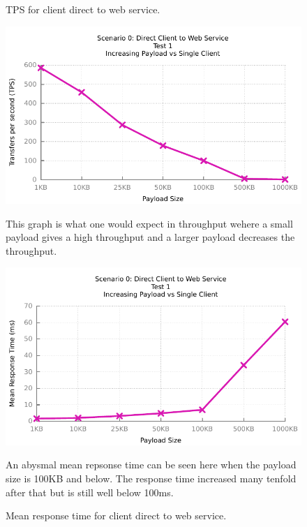 \begin{figure}[H]
	\caption{TPS for client direct to web service.}
	\centerline{\includegraphics{img/direct_fu_ip_tps}}
	\label{fig:direct-1-1}
	This graph is what one would expect in throughput wehere a small payload gives a high throughput and a larger payload decreases the throughput.

	\caption{Mean response time for client direct to web service.}
	\centerline{\includegraphics{img/direct_fu_ip_resp}}
	\label{fig:direct-1-2}
	An abysmal mean repsonse time can be seen here when the payload size is 100KB and below. The response time increased many tenfold after that but is still well below 100ms.
\end{figure}

